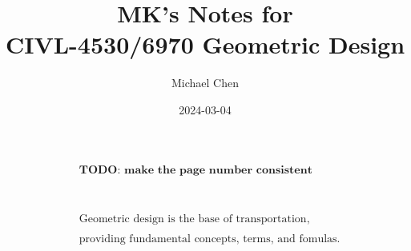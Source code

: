 \documentclass{article}
\title{MK's Notes for \\ CIVL-4530/6970 Geometric Design}
\date{2024-03-04}
\author{Michael Chen}
\begin{document}
  \maketitle

  \begin{align*}
  & \textbf{TODO: make the page number consistent}
  \\
  \\
  \\
  \\
  \\
  \\
  \\
  \\
  & \text{Geometric design is the base of transportation,}\\ 
  \\
  & \text{providing fundamental concepts, terms, and fomulas.}\\
  \end{align*}
  \newpage

  \tableofcontents
  \newpage


  
  \newpage
  
  \newpage
  
  \newpage
  
  \newpage

  
  \newpage


\end{document}
